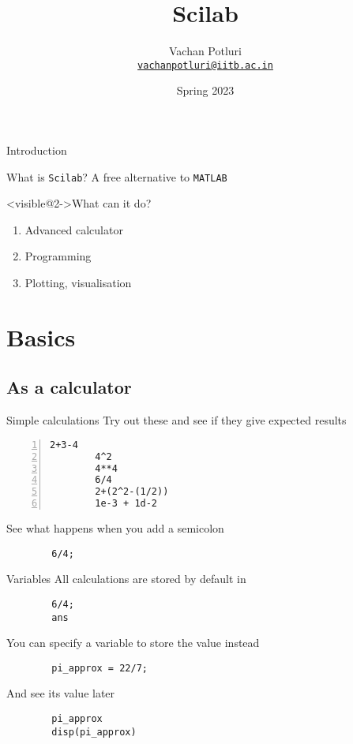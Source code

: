 \documentclass[%
    10pt,
    xcolor={dvipsnames},
    compress, %
]{beamer}
\newcommand{\email}[1]{\href{mailto:#1}{\texttt{#1}}} %
\newcommand{\matlab}{\texttt{MATLAB}}
\newcommand{\scilab}{\texttt{Scilab}}
\begin{document}
\setlength\leftmargini{1em} %
\setlength\leftmarginii{\leftmargini} %
\setlength\leftmarginiii{\leftmarginii} %

{
    \title{Scilab}
    \author[Vachan Potluri]{%
        Vachan Potluri\\
        \email{vachanpotluri@iitb.ac.in}
    }
    \date{Spring 2023}
    \begin{frame}
        \titlepage
    \end{frame}
}

\begin{frame}{Introduction}
    \begin{block}{What is \scilab?}
        A free alternative to \matlab
    \end{block}
    \begin{block}<visible@2->{What can it do?}
        \begin{enumerate}
            \item Advanced calculator
            \item Programming
            \item Plotting, visualisation
        \end{enumerate}
    \end{block}
\end{frame}

\section{Basics}
\subsection{As a calculator}
\begin{frame}[fragile]{Simple calculations}
    Try out these and see if they give expected results
    \begin{lstlisting}[numbers=left]
        2+3-4
        4^2
        4**4
        6/4
        2+(2^2-(1/2))
        1e-3 + 1d-2
    \end{lstlisting}
    See what happens when you add a semicolon
    \begin{lstlisting}
        6/4;
    \end{lstlisting}
\end{frame}

\begin{frame}[fragile]{Variables}
    All calculations are stored by default in 
    \begin{lstlisting}
        6/4;
        ans
    \end{lstlisting}
    You can specify a variable to store the value instead
    \begin{lstlisting}
        pi_approx = 22/7;
    \end{lstlisting}
    And see its value later
    \begin{lstlisting}
        pi_approx
        disp(pi_approx)
    \end{lstlisting}
\end{frame}
\end{document}
